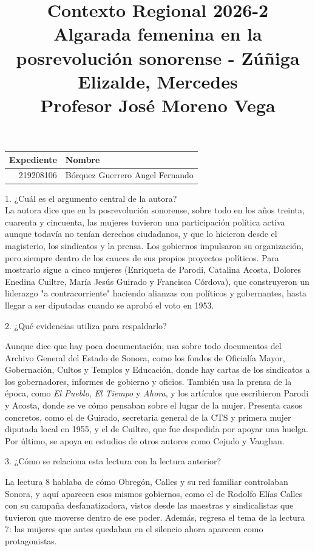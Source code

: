 \documentclass[a4paper, 11pt]{article}
\title
{
    Contexto Regional 2026-2 \\
    Algarada femenina en la posrevolución sonorense - Zúñiga Elizalde, Mercedes \\

    Profesor José Moreno Vega
}
\begin{document}
\begin{otherlanguage}{spanish}
\maketitle
\end{otherlanguage}

\begin{center}
    \begin{tabular}{r|l}
        \textbf{Expediente} & \textbf{Nombre} \\ \hline
        219208106 & Bórquez Guerrero Angel Fernando \\
    \end{tabular}
\end{center}

{\Large 1. ¿Cuál es el argumento central de la autora?} \\
{\color{azul}
    La autora dice que en la posrevolución sonorense, sobre todo en los años treinta, cuarenta y cincuenta, las mujeres tuvieron una participación política activa aunque todavía no tenían derechos ciudadanos, y que lo hicieron desde el magisterio, los sindicatos y la prensa. Los gobiernos impulsaron su organización, pero siempre dentro de los cauces de sus propios proyectos políticos. Para mostrarlo sigue a cinco mujeres (Enriqueta de Parodi, Catalina Acosta, Dolores Enedina Cuiltre, María Jesús Guirado y Francisca Córdova), que construyeron un liderazgo "a contracorriente" haciendo alianzas con políticos y gobernantes, hasta llegar a ser diputadas cuando se aprobó el voto en 1953.
}
\vspace{1cm}

{\Large 2. ¿Qué evidencias utiliza para respaldarlo?} \par
{\color{azul}
Aunque dice que hay poca documentación, usa sobre todo documentos del Archivo General del Estado de Sonora, como los fondos de Oficialía Mayor, Gobernación, Cultos y Templos y Educación, donde hay cartas de los sindicatos a los gobernadores, informes de gobierno y oficios. También usa la prensa de la época, como \textit{El Pueblo}, \textit{El Tiempo} y \textit{Ahora}, y los artículos que escribieron Parodi y Acosta, donde se ve cómo pensaban sobre el lugar de la mujer. Presenta casos concretos, como el de Guirado, secretaria general de la CTS y primera mujer diputada local en 1955, y el de Cuiltre, que fue despedida por apoyar una huelga. Por último, se apoya en estudios de otros autores como Cejudo y Vaughan.
}
\vspace{1cm}

{\Large 3. ¿Cómo se relaciona esta lectura con la lectura anterior?} \par
{\color{azul}
La lectura 8 hablaba de cómo Obregón, Calles y su red familiar controlaban Sonora, y aquí aparecen esos mismos gobiernos, como el de Rodolfo Elías Calles con su campaña desfanatizadora, vistos desde las maestras y sindicalistas que tuvieron que moverse dentro de ese poder. Además, regresa el tema de la lectura 7: las mujeres que antes quedaban en el silencio ahora aparecen como protagonistas.
}
\end{document}
